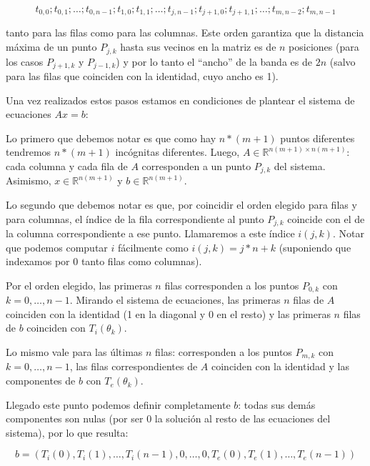 \begin{itemize}
    $$ t_{0,0}; t_{0,1}; \ldots ; t_{0,n-1}; t_{1,0}; t_{1,1}; \ldots ; t_{j,n-1}; t_{j+1,0}; t_{j+1,1}; \ldots ; t_{m, n-2} ; t_{m, n-1}$$ %
    
    tanto para las filas como para las columnas. Este orden garantiza que la distancia máxima de un punto $P_{j,k}$ hasta sus vecinos en la matriz es de $n$ posiciones (para los casos $P_{j+1, k}$ y $P_{j-1, k}$) y por lo tanto el ``ancho'' de la banda es de $2n$ (salvo para las filas que coinciden con la identidad, cuyo ancho es 1).
    
\end{itemize}

Una vez realizados estos pasos estamos en condiciones de plantear el sistema de ecuaciones $Ax=b$:

Lo primero que debemos notar es que como hay $n*(m+1)$ puntos diferentes tendremos $n*(m+1)$ incógnitas diferentes. Luego, $A \in \mathbb{R}^{n(m+1)\times n(m+1)}$: cada columna y cada fila de $A$ corresponden a un punto $P_{j,k}$ del sistema. Asimismo, $x \in \mathbb{R}^{n(m+1)}$ y $b \in \mathbb{R}^{n(m+1)}$. 

Lo segundo que debemos notar es que, por coincidir el orden elegido para filas y para columnas, el índice de la fila correspondiente al punto $P_{j,k}$ coincide con el de la columna correspondiente a ese punto. Llamaremos a este índice $i(j,k)$. Notar que podemos computar $i$ fácilmente como $i(j,k)=j*n+k$ (suponiendo que indexamos por 0 tanto filas como columnas).

Por el orden elegido, las primeras $n$ filas corresponden a los puntos $P_{0,k}$ con $k=0,\ldots,n-1$. Mirando el sistema de ecuaciones, las primeras $n$ filas de $A$ coinciden con la identidad (1 en la diagonal y 0 en el resto) y las primeras $n$ filas de $b$ coinciden con $T_i(\theta_k)$.

Lo mismo vale para las últimas $n$ filas: corresponden a los puntos $P_{m,k}$ con $k=0,\ldots,n-1$, las filas correspondientes de $A$ coinciden con la identidad y las componentes de $b$ con $T_e(\theta_k)$.

Llegado este punto podemos definir completamente $b$: todas sus demás componentes son nulas (por ser $0$ la solución al resto de las ecuaciones del sistema), por lo que resulta:

$$b = (T_i(0), T_i(1), \ldots, T_i(n-1), 0, \ldots, 0, T_e(0), T_e(1), \ldots, T_e(n-1)) $$

